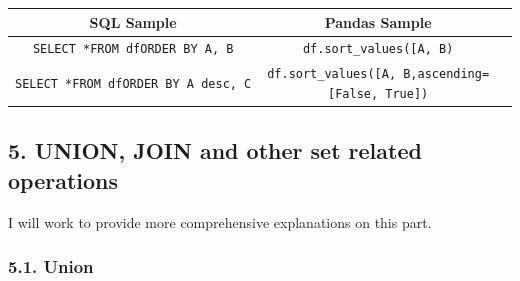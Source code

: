 \documentclass[11pt]{article}
\begin{document}
    \begin{longtable}[]{@{}ccc@{}}
\toprule
\begin{minipage}[b]{0.29\columnwidth}\centering
SQL Sample\strut
\end{minipage} & \begin{minipage}[b]{0.34\columnwidth}\centering
Pandas Sample\strut
\end{minipage} & \begin{minipage}[b]{0.29\columnwidth}\centering
\strut
\end{minipage}\tabularnewline
\midrule
\endhead
\begin{minipage}[t]{0.29\columnwidth}\centering
\texttt{SELECT\ *}\texttt{FROM\ df}\texttt{ORDER\ BY\ A,\ B}\strut
\end{minipage} & \begin{minipage}[t]{0.34\columnwidth}\centering
\texttt{df.sort\_values({[}\textquotesingle{}A\textquotesingle{},\ \textquotesingle{}B\textquotesingle{}{]})}\strut
\end{minipage} & \begin{minipage}[t]{0.29\columnwidth}\centering
\strut
\end{minipage}\tabularnewline
\begin{minipage}[t]{0.29\columnwidth}\centering
\texttt{SELECT\ *}\texttt{FROM\ df}\texttt{ORDER\ BY\ A\ desc,\ C}\strut
\end{minipage} & \begin{minipage}[t]{0.34\columnwidth}\centering
\texttt{df.sort\_values({[}\textquotesingle{}A\textquotesingle{},\ \textquotesingle{}B\textquotesingle{}{]},ascending={[}False,\ True{]})}\strut
\end{minipage} & \begin{minipage}[t]{0.29\columnwidth}\centering
\strut
\end{minipage}\tabularnewline
\bottomrule
\end{longtable}

    \hypertarget{union-join-and-other-set-related-operations}{%
\subsection{5. UNION, JOIN and other set related
operations}\label{union-join-and-other-set-related-operations}}

    I will work to provide more comprehensive explanations on this part.

    \hypertarget{union}{%
\subsubsection{5.1. Union}\label{union}}
\end{document}
